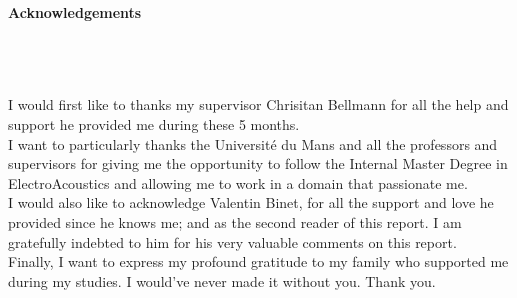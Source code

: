 \documentclass{report}
\begin{document}


\thispagestyle{empty}
\begin{center}
{\Large\textbf{Acknowledgements}} \\~\\~\\~\\
\end{center}

I would first like to thanks my supervisor Chrisitan Bellmann for all the help and support he provided me during these 5 months. \\

I want to particularly thanks the Université du Mans and all the professors and supervisors for giving me the opportunity to follow the Internal Master Degree in ElectroAcoustics and allowing me to work in a domain that passionate me. \\

I would also like to acknowledge Valentin Binet, for all the support and love he provided since he knows me; and as the second reader of this report. I am gratefully indebted to him for his very valuable comments on this report.\\

Finally, I want to express my profound gratitude to my family who supported me during my studies. I would've never made it without you. Thank you.

\newpage

\clearpage
\renewcommand\contentsname{Table of contents}
\tableofcontents
{} %

\clearpage
\listoffigures
{}

\clearpage
\listofmyequations
{}

\end{document}
